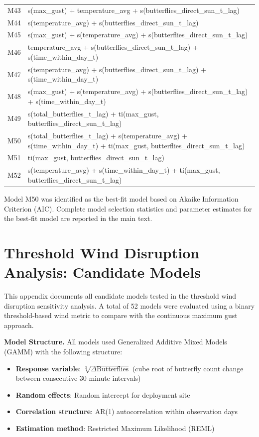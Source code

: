 \documentclass[insects,article,submit,pdftex,moreauthors]{Definitions/mdpi}
\begin{document}
\begin{appendix}
\begin{longtable}{ll}
M43 & s(max\_gust) + temperature\_avg + s(butterflies\_direct\_sun\_t\_lag) \\
M44 & s(temperature\_avg) + s(butterflies\_direct\_sun\_t\_lag) \\
M45 & s(max\_gust) + s(temperature\_avg) + s(butterflies\_direct\_sun\_t\_lag) \\
M46 & temperature\_avg + s(butterflies\_direct\_sun\_t\_lag) + s(time\_within\_day\_t) \\
M47 & s(temperature\_avg) + s(butterflies\_direct\_sun\_t\_lag) + s(time\_within\_day\_t) \\
M48 & s(max\_gust) + s(temperature\_avg) + s(butterflies\_direct\_sun\_t\_lag) + s(time\_within\_day\_t) \\
M49 & s(total\_butterflies\_t\_lag) + ti(max\_gust, butterflies\_direct\_sun\_t\_lag) \\
M50 & s(total\_butterflies\_t\_lag) + s(temperature\_avg) + s(time\_within\_day\_t) + ti(max\_gust, butterflies\_direct\_sun\_t\_lag) \\
M51 & ti(max\_gust, butterflies\_direct\_sun\_t\_lag) \\
M52 & s(temperature\_avg) + s(time\_within\_day\_t) + ti(max\_gust, butterflies\_direct\_sun\_t\_lag) \\
\bottomrule
\end{longtable}

Model M50 was identified as the best-fit model based on Akaike Information Criterion (AIC). Complete model selection statistics and parameter estimates for the best-fit model are reported in the main text.


\section{Threshold Wind Disruption Analysis: Candidate Models}
\label{app:threshold_models}

This appendix documents all candidate models tested in the threshold wind disruption sensitivity analysis. A total of 52 models were evaluated using a binary threshold-based wind metric to compare with the continuous maximum gust approach.

\textbf{Model Structure.}
All models used Generalized Additive Mixed Models (GAMM) with the following structure:
\begin{itemize}
\item \textbf{Response variable}: $\sqrt[3]{\Delta\text{Butterflies}}$ (cube root of butterfly count change between consecutive 30-minute intervals)
\item \textbf{Random effects}: Random intercept for deployment site
\item \textbf{Correlation structure}: AR(1) autocorrelation within observation days
\item \textbf{Estimation method}: Restricted Maximum Likelihood (REML)
\end{itemize}


\end{appendix}
\end{document}
